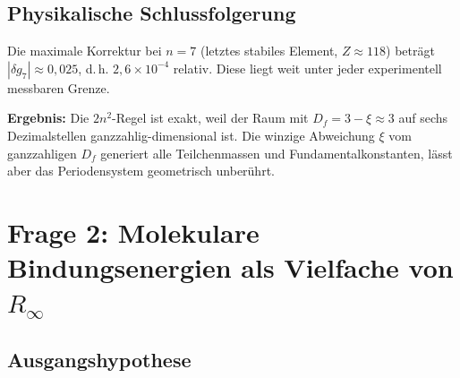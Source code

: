 \begin{table}[htbp]
\centering
\caption{T0-Korrektur der Schalenentartung $g_n^{(\mathrm{T0})} = 2n^{2-\xi}$}
\label{tab:gn-korrektur}
\end{table}

\subsection{Physikalische Schlussfolgerung}
\label{subsec:schluss-gn}

Die maximale Korrektur bei $n=7$ (letztes stabiles Element, $Z \approx 118$)
beträgt $|\delta g_7| \approx 0{,}025$, d.\,h. $2{,}6 \times 10^{-4}$ relativ.
Diese liegt weit unter jeder experimentell messbaren Grenze.

\textbf{Ergebnis:} Die $2n^2$-Regel ist exakt, weil der Raum mit
$D_f = 3 - \xi \approx 3$ auf sechs Dezimalstellen ganzzahlig-dimensional ist.
Die winzige Abweichung $\xi$ vom ganzzahligen $D_f$ generiert alle
Teilchenmassen und Fundamentalkonstanten, lässt aber das Periodensystem
geometrisch unberührt.

\section{Frage 2: Molekulare Bindungsenergien als Vielfache von \texorpdfstring{$R_\infty$}{R\_inf}}
\label{sec:bindungsenergien}

\subsection{Ausgangshypothese}
\label{subsec:hypothese-be}

